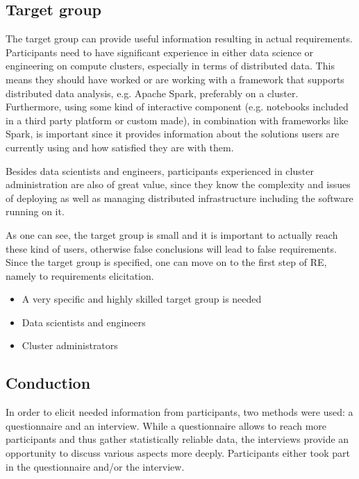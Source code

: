 \documentclass[a4paper,twoside]{article}
\begin{document}
\subsection{Target group}

The target group can provide useful information resulting in actual requirements. Participants need to have significant experience in either data science or engineering on compute clusters, especially in terms of distributed data. This means they should have worked or are working with a framework that supports distributed data analysis, e.g. Apache Spark, preferably on a cluster. Furthermore, using some kind of interactive component (e.g. notebooks included in a third party platform or custom made), in combination with frameworks like Spark, is important since it provides information about the solutions users are currently using and how satisfied they are with them.

Besides data scientists and engineers, participants experienced in cluster administration are also of great value, since they know the complexity and issues of deploying as well as managing distributed infrastructure including the software running on it. 

As one can see, the target group is small and it is important to actually reach these kind of users, otherwise false conclusions will lead to false requirements. Since the target group is specified, one can move on to the first step of RE, namely to requirements elicitation.

\begin{itemize}
    \item A very specific and highly skilled target group is needed
    \item Data scientists and engineers
    \item Cluster administrators
\end{itemize}

\subsection{Conduction}

In order to elicit needed information from participants, two methods were used: a questionnaire and an interview. While a questionnaire allows to reach more participants and thus gather statistically reliable data, the interviews provide an opportunity to discuss various aspects more deeply. Participants either took part in the questionnaire and/or the interview. 
\end{document}
